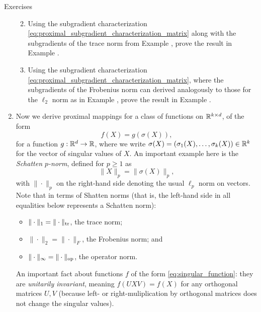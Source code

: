 \begin{xcb}{Exercises}
\begin{enumerate}[label=\thechapter.\arabic*]
\begin{enumerate}[label=\alph*.]
\item Using the subgradient characterization 
  \eqref{eq:proximal_subgradient_characterization_matrix} along with the
  subgradients of the trace norm from Example
  , prove the result in Example
  . 

\item Using the subgradient characterization 
  \eqref{eq:proximal_subgradient_characterization_matrix}, where the
  subgradients of the Frobenius norm can derived analogously to those for the
  $\ell_2$ norm as in Example , prove the result
  in Example .  
\end{enumerate}

\item \label{ex:matrix_norm_proximal_mapping2}
  Now we derive proximal mappings for a class of functions on $\mathbb{R}^{k \times d}$,
  of the form 
  \begin{equation}
  \label{eq:singular_function}
  f(X) = g(\sigma(X)), 
  \end{equation}
  for a function $g : \mathbb{R}^d \to \mathbb{R}$, where we write $\sigma(X) = (\sigma_1(X), \dots,
  \sigma_k(X)) \in \mathbb{R}^k$ for the vector of singular values of $X$. An important
  example here is the \emph{Schatten $p$-norm}, defined for $p \geq 1$ as
  \begin{equation}
  \label{eq:schatten_norm}
  \|X\|_p = \|\sigma(X)\|_p,
  \end{equation}
  with $\|\cdot\|_p$ on the right-hand side denoting the usual $\ell_p$ norm on
  vectors. Note that in terms of Shatten norms (that is, the left-hand side in
  all equalities below represents a Schatten norm): 
  \begin{itemize}
  \item $\|\cdot\|_1 = \|\cdot\|_{\operatorname{tr}}$, the trace norm;
  \item $\|\cdot\|_2 = \|\cdot\|_F$, the Frobenius norm; and
  \item $\|\cdot\|_\infty = \|\cdot\|_{\mathrm{op}}$, the operator norm.  
  \end{itemize}
  An important fact about functions $f$ of the form
  \eqref{eq:singular_function}: they are \emph{unitarily invariant}, meaning 
  $f(UXV) = f(X)$ for any orthogonal matrices $U,V$ (because left- or
  right-muliplication by orthogonal matrices does not change the singular
  values).    
  

\end{enumerate}
\end{xcb}
